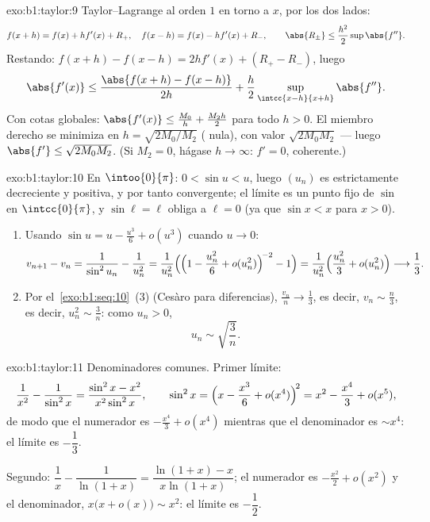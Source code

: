\begin{solution}{exo:b1:taylor:9}
Taylor--Lagrange al orden $1$ en torno a $x$, por los dos lados:
\[
f(x + h) = f(x) + h f'(x) + R_+,\quad
f(x - h) = f(x) - h f'(x) + R_-,
\qquad \abs{R_\pm} \leq \frac{h^2}{2} \sup \abs{f''} .
\]
Restando: $f(x+h) - f(x-h) = 2h f'(x) + (R_+ - R_-)$, luego
\[
\abs{f'(x)} \leq \frac{\abs{f(x+h) - f(x-h)}}{2h} +
\frac{h}{2}\sup_{\intcc{x-h}{x+h}}\abs{f''} .
\]
Con cotas globales:
$\abs{f'(x)} \leq \frac{M_0}{h} + \frac{M_2 h}{2}$ para todo
$h > 0$. El miembro derecho se minimiza en $h = \sqrt{2M_0/M_2}$
( nula), con valor $\sqrt{2M_0M_2}$ --- luego
$\abs{f'} \leq \sqrt{2M_0M_2}$. (Si $M_2 = 0$, hágase $h \to \infty$:
$f' = 0$, coherente.)
\end{solution}

\begin{solution}{exo:b1:taylor:10}
En $\intoo{0}{\pi}$: $0 < \sin u < u$, luego $(u_n)$ es
estrictamente decreciente y positiva, y por tanto convergente; el
límite es un punto fijo de $\sin$ en $\intcc{0}{\pi}$, y
$\sin \ell = \ell$ obliga a $\ell = 0$ (ya que $\sin x < x$ para
$x > 0$).
\begin{enumerate}
  \item Usando $\sin u = u - \frac{u^3}{6} + o(u^3)$ cuando $u \to 0$:
        \[
        v_{n+1} - v_n = \frac{1}{\sin^2 u_n} - \frac{1}{u_n^2}
        = \frac{1}{u_n^2}\Bigl(\Bigl(1 - \frac{u_n^2}{6} +
        o(u_n^2)\Bigr)^{\!-2} - 1\Bigr)
        = \frac{1}{u_n^2}\Bigl(\frac{u_n^2}{3} + o(u_n^2)\Bigr)
        \longrightarrow \frac13 .
        \]
  \item Por el~\cref{exo:b1:seq:10}~(3) (Cesàro para diferencias),
        $\frac{v_n}{n} \to \frac13$, es decir, $v_n \sim \frac n3$,
        es decir, $u_n^2 \sim \frac 3n$: como $u_n > 0$,
        \[
        u_n \sim \sqrt{\frac{3}{n}} .
        \]
\end{enumerate}
\end{solution}

\begin{solution}{exo:b1:taylor:11}
Denominadores comunes. Primer límite:
\[
\frac{1}{x^2} - \frac{1}{\sin^2 x}
= \frac{\sin^2 x - x^2}{x^2\sin^2 x},
\qquad
\sin^2 x = \Bigl(x - \frac{x^3}{6} + o(x^4)\Bigr)^{\!2}
= x^2 - \frac{x^4}{3} + o(x^5) ,
\]
de modo que el numerador es $-\frac{x^4}{3} + o(x^4)$ mientras que
el denominador es $\sim x^4$: el límite es $-\dfrac13$.

Segundo: $\dfrac1x - \dfrac{1}{\ln(1+x)} = \dfrac{\ln(1+x) -
x}{x\ln(1+x)}$; el numerador es $-\frac{x^2}{2} + o(x^2)$ y el
denominador, $x\bigl(x + o(x)\bigr) \sim x^2$: el límite es
$-\dfrac12$.
\end{solution}

